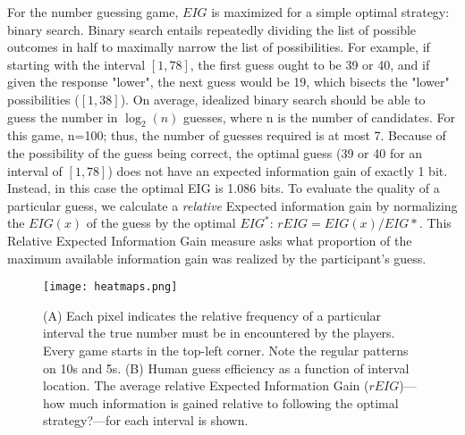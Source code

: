 \documentclass[10pt,letterpaper]{article}
\begin{document}
For the number guessing game, $EIG$ is maximized for a simple optimal strategy: binary search. Binary search entails repeatedly dividing the list of possible outcomes in half to maximally narrow the list of possibilities.  
For example, if starting with the interval $[1, 78]$, the first guess ought to be 39 or 40, and if given the response "lower", the next guess would be 19, which bisects the "lower" possibilities ($[1, 38]$).  
On average, idealized binary search should be able to guess the number in $\log_2(n)$ guesses, where n is the number of candidates. For this game, n=100; thus, the number of guesses required is at most 7. 
Because of the possibility of the guess being correct, the optimal guess (39 or 40 for an interval of $[1, 78]$) does not have an expected information gain of exactly 1 bit.
Instead, in this case the optimal EIG is 1.086 bits.  
To evaluate the quality of a particular guess, we calculate a \textit{relative} Expected information gain by normalizing the $EIG(x)$ of the guess by the optimal $EIG^*$:  $rEIG = EIG(x) / EIG*$.
This Relative Expected Information Gain measure asks what proportion of the maximum available information gain was realized by the participant's guess.




\begin{figure*}[t]
\begin{center}
    \texttt{[image: heatmaps.png]}
\end{center}
    \vspace{-6mm}
    \caption{(A) Each pixel indicates the relative frequency of a particular interval the true number must be in encountered by the players. Every game starts in the top-left corner. Note the regular patterns on 10s and 5s.
    (B) Human guess efficiency as a function of interval location. The average relative Expected Information Gain ($rEIG$)---how much information is gained relative to following the optimal strategy?---for each interval is shown.
}
    \label{fig:heatmap}
    \vspace{-2mm}
\end{figure*}
\end{document}
